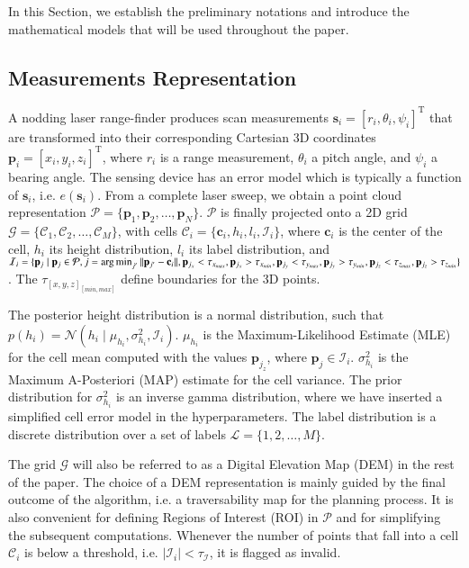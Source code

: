 In this Section, we establish the preliminary notations and introduce the
mathematical models that will be used throughout the paper.

\subsection{Measurements Representation}
A nodding laser range-finder produces scan measurements $\mathbf{s}_i=[r_i,
\theta_i,\psi_i]^\text{T}$ that are transformed into their corresponding
Cartesian 3D coordinates $\mathbf{p}_i=[x_i,y_i,z_i]^\text{T}$, where $r_i$ is
a range measurement, $\theta_i$ a pitch angle, and $\psi_i$ a bearing angle. The
sensing device has an error model which is typically a function of
$\mathbf{s}_i$, i.e. $e(\mathbf{s}_i)$. From a complete laser sweep, we obtain a
point cloud representation $\mathcal{P}=\{\mathbf{p}_1,\mathbf{p}_2,\dots,
\mathbf{p}_N\}$. $\mathcal{P}$ is finally projected onto a 2D grid $\mathcal{G}=
\{\mathcal{C}_1,\mathcal{C}_2,\dots,\mathcal{C}_M\}$, with cells $\mathcal{C}_i=
\{\mathbf{c}_i,h_i,l_i,\mathcal{I}_i\}$, where $\mathbf{c}_i$ is the center of
the cell, $h_i$ its height distribution, $l_i$ its label distribution, and
$\mathcal{I}_i=\{\mathbf{p}_j\mid\mathbf{p}_j\in\mathcal{P},j=\operatorname*{arg\,min}_{j'}||
\mathbf{p}_{j'}-\mathbf{c}_i||,\mathbf{p}_{j_x}<\tau_{x_{max}},\mathbf{p}_{j_x}>
\tau_{x_{min}},\mathbf{p}_{j_y}<\tau_{y_{max}},\mathbf{p}_{j_y}>\tau_{y_{min}},
\mathbf{p}_{j_z}<\tau_{z_{max}},\mathbf{p}_{j_z}>\tau_{z_{min}}\}$. The
$\tau_{[x,y,z]_{[min,max]}}$ define boundaries for the 3D points.

The posterior height distribution is a normal distribution, such that $p(h_i)=
\mathcal{N}(h_i\mid\mu_{h_i},\sigma^2_{h_i},\mathcal{I}_i)$. $\mu_{h_i}$ is the
Maximum-Likelihood Estimate (MLE) for the cell mean computed with the values
$\mathbf{p}_{j_z}$, where $\mathbf{p}_j\in\mathcal{I}_i$. $\sigma^2_{h_i}$ is
the Maximum A-Posteriori (MAP) estimate for the cell variance. The prior
distribution for $\sigma^2_{h_i}$ is an inverse gamma distribution, where we
have inserted a simplified cell error model in the hyperparameters. The label
distribution is a discrete distribution over a set of labels
$\mathcal{L}=\{1,2,\dots,M\}$.

The grid $\mathcal{G}$ will also be referred to as a Digital Elevation Map (DEM)
in the rest of the paper. The choice of a DEM representation is mainly guided by
the final outcome of the algorithm, i.e. a traversability map for the planning
process. It is also convenient for defining Regions of Interest (ROI) in
$\mathcal{P}$ and for simplifying the subsequent computations. Whenever the
number of points that fall into a cell $\mathcal{C}_i$ is below a threshold,
i.e. $|\mathcal{I}_i|<\tau_{\mathcal{I}}$, it is flagged as invalid.

